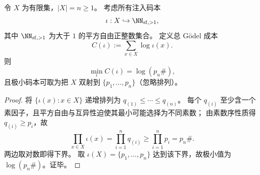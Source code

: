 \begin{proposition}\label{prop:group-jg-min-total-godel-cost-primorial}
令 \(X\) 为有限集，\(|X|=n\ge 1\)。
考虑所有注入码本
\[
\iota: X\hookrightarrow \NN_{\mathrm{sf},>1},
\]
其中 \(\NN_{\mathrm{sf},>1}\) 为大于 \(1\) 的平方自由正整数集合。
定义总 Gödel 成本
\[
C(\iota):=\sum_{x\in X}\log \iota(x).
\]
则
\[
\min_{\iota} C(\iota)=\log(p_n\#),
\]
且极小码本可取为把 \(X\) 双射到 \(\{p_1,\dots,p_n\}\)（忽略排列）。
\end{proposition}

\begin{proof}
将 \(\{\iota(x):x\in X\}\) 递增排列为 \(q_{(1)}\le\cdots\le q_{(n)}\)。
每个 \(q_{(i)}\) 至少含一个素因子，且平方自由与互异性迫使其最小可能选择为不同素数；
由素数序性质得 \(q_{(i)}\ge p_i\)，故
\[
\prod_{x\in X}\iota(x)=\prod_{i=1}^n q_{(i)}\ge \prod_{i=1}^n p_i=p_n\#.
\]
两边取对数即得下界。
取 \(\iota(X)=\{p_1,\dots,p_n\}\) 达到该下界，故极小值为 \(\log(p_n\#)\)。证毕。
\end{proof}

\endinput

